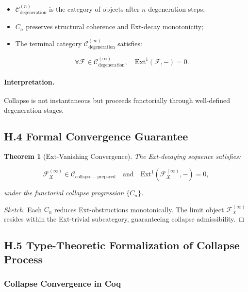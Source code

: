 \documentclass[11pt]{article}
\newtheorem{theorem}{Theorem}[section]
\begin{document}
\begin{itemize}
    \item \( \mathcal{C}_{\mathrm{degeneration}}^{(n)} \) is the category of objects after \( n \) degeneration steps;
    \item \( C_n \) preserves structural coherence and Ext-decay monotonicity;
    \item The terminal category \( \mathcal{C}_{\mathrm{degeneration}}^{(\infty)} \) satisfies:

\[
\forall \mathcal{F} \in \mathcal{C}_{\mathrm{degeneration}}^{(\infty)}, \quad \mathrm{Ext}^1(\mathcal{F}, -) = 0.
\]
\end{itemize}

\paragraph{Interpretation.}
Collapse is not instantaneous but proceeds functorially through well-defined degeneration stages.

\subsection*{H.4 Formal Convergence Guarantee}

\begin{theorem}[Ext-Vanishing Convergence]
The Ext-decaying sequence satisfies:

\[
\mathcal{F}_X^{(\infty)} \in \mathcal{C}_{\mathrm{collapse-prepared}} \quad \text{and} \quad \mathrm{Ext}^1(\mathcal{F}_X^{(\infty)}, -) = 0,
\]

under the functorial collapse progression \( \{ C_n \} \).
\end{theorem}

\begin{proof}[Sketch]
Each \( C_n \) reduces Ext-obstructions monotonically. The limit object \( \mathcal{F}_X^{(\infty)} \) resides within the Ext-trivial subcategory, guaranteeing collapse admissibility.
\end{proof}

\subsection*{H.5 Type-Theoretic Formalization of Collapse Process}

\subsubsection*{Collapse Convergence in Coq}
\end{document}
